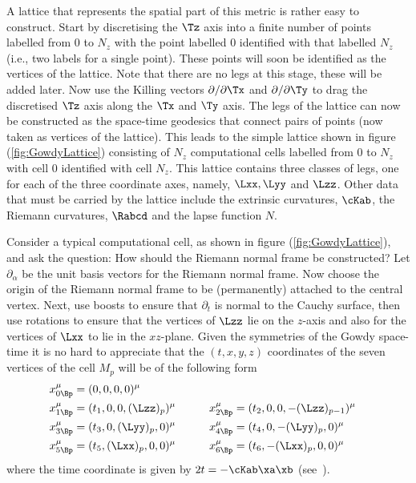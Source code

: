\documentclass[a4paper,12pt]{article}
\numberwithin{equation}{section}
\begin{document}
A lattice that represents the spatial part of this metric is rather easy to construct.
Start by discretising the $\Tz$ axis into a finite number of points labelled from $0$ to
$N_z$ with the point labelled $0$ identified with that labelled $N_z$ (i.e., two labels for
a single point). These points will soon be identified as the vertices of the lattice. Note
that there are no legs at this stage, these will be added later. Now use the Killing
vectors $\partial/\partial \Tx$ and $\partial/\partial \Ty$ to drag the discretised $\Tz$
axis along the $\Tx$ and $\Ty$ axis. The legs of the lattice can now be constructed as the
space-time geodesics that connect pairs of points (now taken as vertices of the lattice).
This leads to the simple lattice shown in figure (\ref{fig:GowdyLattice}) consisting of $N_z$
computational cells labelled from $0$ to $N_z$ with cell $0$ identified with cell $N_z$. This
lattice contains three classes of legs, one for each of the three coordinate axes, namely,
$\Lxx,\Lyy$ and $\Lzz$. Other data that must be carried by the lattice include the
extrinsic curvatures, $\cKab$, the Riemann curvatures, $\Rabcd$ and the lapse function $N$.

Consider a typical computational cell, as shown in figure (\ref{fig:GowdyLattice}), and ask
the question: How should the Riemann normal frame be constructed? Let $\partial_\alpha$ be
the unit basis vectors for the Riemann normal frame. Now choose the origin of the Riemann
normal frame to be (permanently) attached to the central vertex. Next, use boosts to ensure
that $\partial_t$ is normal to the Cauchy surface, then use rotations to ensure that the
vertices of $\Lzz$ lie on the $z$-axis and also for the vertices of $\Lxx$ to lie in the
$xz$-plane. Given the symmetries of the Gowdy space-time it is no hard to appreciate that
the $(t,x,y,z)$ coordinates of the seven vertices of the cell $M_p$ will be of the following
form
\begin{equation}
   \begin{aligned}
   x^\mu_{0\Bp} &= (0,0,0,0)^\mu\\
   x^\mu_{1\Bp} &= (t_1,0,0,(\Lzz)_{p})^\mu&\qquad
   x^\mu_{2\Bp} &= (t_2,0,0,-(\Lzz)_{p-1})^\mu\\
   x^\mu_{3\Bp} &= (t_3,0,(\Lyy)_p,0)^\mu&
   x^\mu_{4\Bp} &= (t_4,0,-(\Lyy)_p,0)^\mu\\
   x^\mu_{5\Bp} &= (t_5,(\Lxx)_p,0,0)^\mu&
   x^\mu_{6\Bp} &= (t_6,-(\Lxx)_p,0,0)^\mu
   \end{aligned}
\end{equation}
where the time coordinate is given by $2t = -\cKab\xa\xb$ (see~\cite{brewin:2010-03}).
\end{document}
